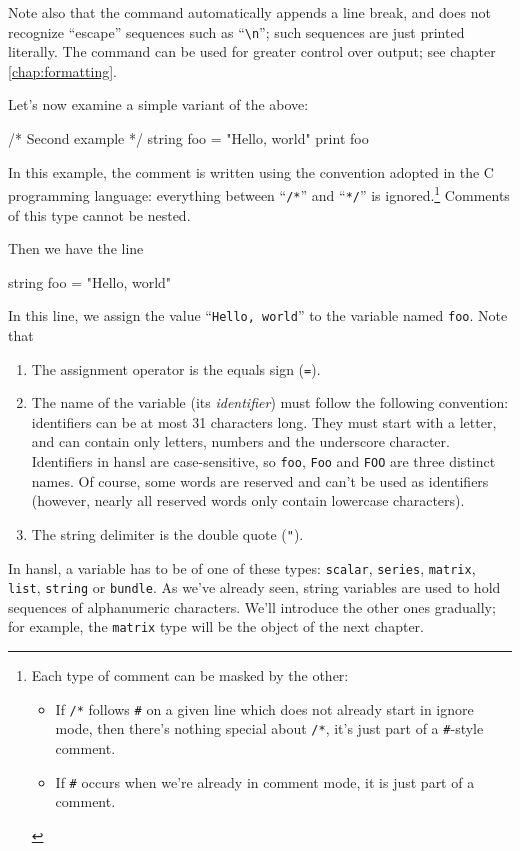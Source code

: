 Note also that the  command automatically appends a line
break, and does not recognize ``escape'' sequences such as
``\verb|\n|''; such sequences are just printed literally. The
 command can be used for greater control over output; see
chapter \ref{chap:formatting}.

Let's now examine a simple variant of the above:
\begin{code}
  /*
    Second example
  */
  string foo = "Hello, world"
  print foo
\end{code}

In this example, the comment is written using the convention adopted
in the C programming language: everything between ``\verb|/*|'' and
``\verb|*/|'' is ignored.\footnote{Each type of comment can be masked
  by the other:
\begin{itemize}
\item If \texttt{/*} follows \texttt{\#} on a given line which does
  not already start in ignore mode, then there's nothing special about
  \texttt{/*}, it's just part of a \texttt{\#}-style comment.
\item If \texttt{\#} occurs when we're already in comment mode, it is
  just part of a comment.
\end{itemize}} Comments of this type cannot be nested.

Then we have the line
\begin{code}
  string foo = "Hello, world"
\end{code}
In this line, we assign the value ``\texttt{Hello, world}'' to the
variable named \texttt{foo}. Note that
\begin{enumerate}
\item The assignment operator is the equals sign (\texttt{=}).
\item The name of the variable (its \emph{identifier}) must follow
  the following convention: identifiers can be at most 31 characters
  long. They must start with a letter, and can contain only letters,
  numbers and the underscore character. Identifiers in hansl are
  case-sensitive, so \texttt{foo}, \texttt{Foo} and \texttt{FOO} are
  three distinct names. Of course, some words are reserved and can't
  be used as identifiers (however, nearly all reserved words only
  contain lowercase characters).
\item The string delimiter is the double quote (\verb|"|). 
\end{enumerate}

In hansl, a variable has to be of one of these types: \texttt{scalar},
\texttt{series}, \texttt{matrix}, \texttt{list}, \texttt{string} or
\texttt{bundle}. As we've already seen, string variables are used to
hold sequences of alphanumeric characters. We'll introduce the other
ones gradually; for example, the \texttt{matrix} type will be the
object of the next chapter.  

